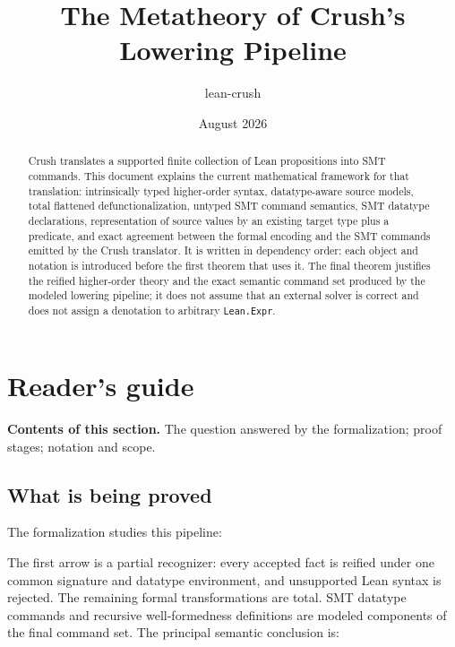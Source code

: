 \documentclass[11pt]{article}
\title{The Metatheory of Crush's Lowering Pipeline}
\author{lean-crush}
\date{August 2026}
\theoremstyle{remark}
\newcommand{\sectioncontents}[1]{%
  \smallskip\noindent\textbf{Contents of this section.} #1\par\medskip}
\begin{document}
\maketitle

\begin{abstract}
Crush translates a supported finite collection of Lean propositions into SMT
commands. This document explains the current mathematical framework for that
translation: intrinsically typed higher-order syntax, datatype-aware source
models, total flattened defunctionalization, untyped SMT command semantics,
SMT datatype declarations, representation of source values by an existing
target type plus a predicate, and exact agreement between the formal encoding
and the SMT commands emitted by the Crush translator. It is written in dependency order:
each object and notation is introduced before the first theorem that uses it.
The final theorem justifies the reified higher-order theory and the exact
semantic command set produced by the modeled lowering pipeline; it does not
assume that an external solver is correct and does not assign a denotation to
arbitrary \texttt{Lean.Expr}.
\end{abstract}

\tableofcontents

\section{Reader's guide}
\sectioncontents{The question answered by the formalization; proof stages; notation and scope.}

\subsection{What is being proved}

The formalization studies this pipeline:
\begin{center}
\end{center}
The first arrow is a partial recognizer: every accepted fact is reified under
one common signature and datatype environment, and unsupported Lean syntax is
rejected. The remaining formal transformations are total. SMT datatype
commands and recursive well-formedness definitions are modeled components of
the final command set. The principal semantic conclusion is:
\end{document}
